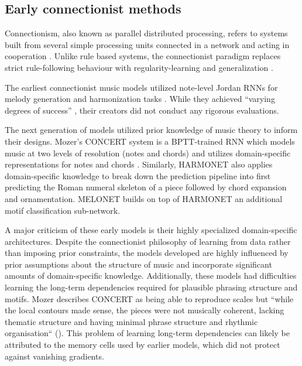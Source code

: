 \subsection{Early connectionist methods}

Connectionism, also known as parallel distributed processing, refers to systems
built from several simple processing units connected in a network and acting in
cooperation \citep{pdp1986parallel}. Unlike rule based systems, the
connectionist paradigm replaces strict rule-following behaviour with
regularity-learning and generalization \citep{dolson1989machine}.

The earliest connectionist music models utilized note-level Jordan
RNNs \citep{jordan1997serial} for melody generation and harmonization tasks
\citep{todd1988sequential,todd1989connectionist,bharucha1989modeling}.
While they achieved ``varying degrees of success'' \citep{griffith1999musical},
their creators did not conduct any rigorous evaluations.

The next generation of models utilized prior knowledge of music theory to
inform their designs. Mozer's CONCERT \citep{mozer1994neural} system is a BPTT-trained
RNN which models music at two levels of resolution (notes and chords) and
utilizes domain-specific representations for notes
\citep{shepard1982geometrical} and chords \citep{laden1989representation}.
Similarly, HARMONET \citep{hild1991harmonet} also applies domain-specific
knowledge to break down the prediction pipeline into first predicting the Roman
numeral skeleton of a piece followed by chord expansion and ornamentation.
MELONET \citep{feulner1994melonet,hornel1997melonet} builds on top of HARMONET
an additional motif classification sub-network.

A major criticism of these early models is their highly specialized
domain-specific architectures. Despite the connectionist philosophy of learning
from data rather than imposing prior constraints, the models developed are
highly influenced by prior assumptions about the structure of music and
incorporate significant amounts of domain-specific knowledge. Additionally,
these models had difficulties learning the long-term dependencies required for
plausible phrasing structure and motifs. Mozer describes CONCERT as being able
to reproduce scales but ``while the local contours made sense, the pieces were
not musically coherent, lacking thematic structure and having minimal phrase
structure and rhythmic organisation`` (\citet{mozer1994neural}). This problem of
learning long-term dependencies can likely be attributed to the memory cells
used by earlier models, which did not protect against vanishing gradients.

